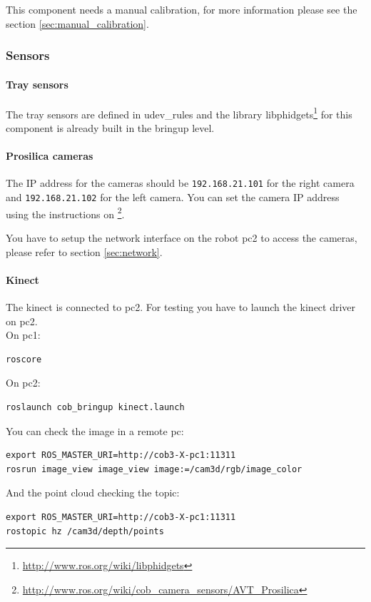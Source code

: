This component needs a manual calibration, for more information please see the section \ref{sec:manual_calibration}.

\subsubsection{Sensors} 

\paragraph{Tray sensors}
The tray sensors are defined in udev\_rules and the library libphidgets\footnote{\url{http://www.ros.org/wiki/libphidgets}} for this component is already built in the bringup level.


\paragraph{Prosilica cameras}
The IP address for the cameras should be \texttt{192.168.21.101} for the right camera and \texttt{192.168.21.102} for the left camera. You can set the camera IP address using the instructions on \footnote{\url{http://www.ros.org/wiki/cob_camera_sensors/AVT_Prosilica}}.

You have to setup the network interface on the robot pc2 to access the cameras, please refer to section \ref{sec:network}.

\paragraph{Kinect}
The kinect is connected to pc2. 
For testing you have to launch the kinect driver on pc2.
\\On pc1:
\begin{lstlisting}
roscore
\end{lstlisting}
On pc2:
\begin{lstlisting}
roslaunch cob_bringup kinect.launch
\end{lstlisting}

You can check the image in a remote pc:
\begin{lstlisting}
export ROS_MASTER_URI=http://cob3-X-pc1:11311
rosrun image_view image_view image:=/cam3d/rgb/image_color
\end{lstlisting}

And the point cloud checking the topic:
\begin{lstlisting}
export ROS_MASTER_URI=http://cob3-X-pc1:11311
rostopic hz /cam3d/depth/points
\end{lstlisting}

